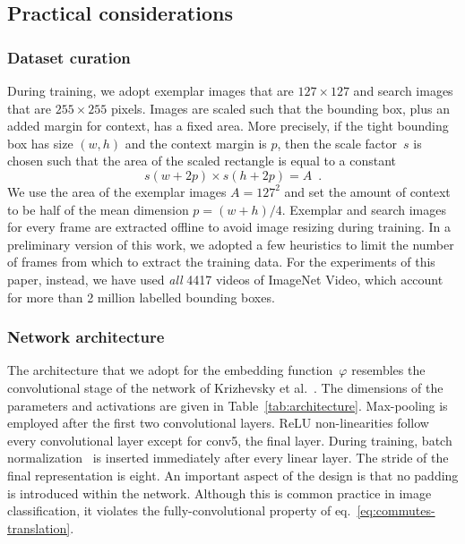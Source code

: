 \subsection{Practical considerations}
\label{sec:considerations}



\subsubsection{Dataset curation}
During training, we adopt exemplar images that are $127 \times 127$ and search images that are $255 \times 255$ pixels.
Images are scaled such that the bounding box, plus an added margin for context, has a fixed area.
More precisely, if the tight bounding box has size $(w, h)$ and the context margin is $p$, then the scale factor~$s$ is chosen such that the area of the scaled rectangle is equal to a constant
\begin{equation}
s (w + 2 p) \times s (h + 2 p) = A \enspace .
\end{equation}
We use the area of the exemplar images $A = 127^2$ and set the amount of context to be half of the mean dimension $p = (w+h) / 4$.
Exemplar and search images for every frame are extracted offline to avoid image resizing during training.
In a preliminary version of this work, we adopted a few heuristics to limit the number of frames from which to extract the training data.
For the experiments of this paper, instead, we have used \emph{all} 4417 videos of ImageNet Video, which account for more than 2 million labelled bounding boxes.

\subsubsection{Network architecture}
The architecture that we adopt for the embedding function~$\varphi$ resembles the convolutional stage of the network of Krizhevsky et al.~\cite{krizhevsky2012imagenet}.
The dimensions of the parameters and activations are given in Table~\ref{tab:architecture}.
Max-pooling is employed after the first two convolutional layers.
ReLU non-linearities follow every convolutional layer except for conv5, the final layer.
During training, batch normalization~\cite{ioffe2015batch} is inserted immediately after every linear layer.
The stride of the final representation is eight.
An important aspect of the design is that no padding is introduced within the network.
Although this is common practice in image classification, it violates the fully-convolutional property of eq.~\ref{eq:commutes-translation}.

